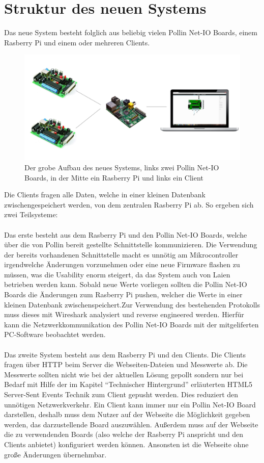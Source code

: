 \section{Struktur des neuen Systems}
Das neue System besteht folglich aus beliebig vielen Pollin Net-IO Boards, einem
Rasberry Pi und einem oder mehreren Clients. 
\begin{figure}[H]
\centering
\includegraphics[width=13cm]{content/pictures/neues_system.png}
\caption[Schematischer Aufbau der Erweiterung]{Der grobe Aufbau des neues
Systems, links zwei Pollin Net-IO Boards, in der Mitte ein Rasberry Pi und links ein Client}
\label{struktur}
\end{figure}
Die Clients fragen alle Daten, welche in einer kleinen Datenbank
zwischengespeichert werden, von dem zentralen Rasberry Pi ab. So ergeben
sich zwei Teilsysteme: \\
\\
Das erste besteht aus dem Rasberry Pi und den Pollin Net-IO Boards,
welche über die von Pollin bereit gestellte Schnittstelle kommunizieren.
Die Verwendung der bereits vorhandenen Schnittstelle macht es unnötig am
Mikrocontroller irgendwelche Änderungen vorzunehmen oder eine neue Firmware
flashen zu müssen, was die Usability enorm steigert, da das System auch von
Laien betrieben werden kann. Sobald neue Werte vorliegen sollten die Pollin
Net-IO Boards die Änderungen zum Rasberry Pi pushen, welcher die Werte in einer
kleinen Datenbank zwischenspeichert.Zur Verwendung des bestehenden Protokolls 
muss dieses mit Wireshark analysiert und reverse engineered werden. Hierfür 
kann die Netzwerkkommunikation des Pollin Net-IO Boards mit der mitgeliferten 
PC-Software beobachtet werden.\\
\\
Das zweite System besteht aus dem Rasberry Pi und den Clients. Die Clients
fragen über HTTP beim Server die Webseiten-Dateien und Messwerte ab. Die
Messwerte sollten nicht wie bei der aktuellen Lösung gepollt sondern nur bei
Bedarf mit Hilfe der im Kapitel "`Technischer Hintergrund"' erläuterten HTML5
Server-Sent Events Technik zum Client gepusht werden. Dies reduziert den
unnötigen Netzwerkverkehr. Ein Client kann immer nur ein Pollin Net-IO Board
darstellen, deshalb muss dem Nutzer auf der Webseite die Möglichkeit gegeben
werden, das darzustellende Board auszuwählen. Außerdem muss auf der Webseite die
zu verwendenden Boards (also welche der Rasberry Pi anspricht und den Clients
anbietet) konfiguriert werden können. Ansonsten ist die Webseite ohne große
Änderungen übernehmbar.


